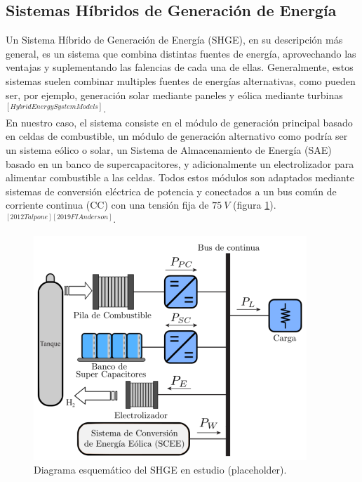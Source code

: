 \subsection{Sistemas Híbridos de Generación de Energía}

Un Sistema Híbrido de Generación de Energía (SHGE), en su descripción más general, es un sistema que combina distintas fuentes de energía, aprovechando las ventajas y suplementando las falencias de cada una de ellas. Generalmente, estos sistemas suelen combinar multiples fuentes de energías alternativas, como pueden ser, por ejemplo, generación solar mediante paneles y eólica mediante turbinas$^{[HybridEnergySystemModels]}$.\\

En nuestro caso, el sistema consiste en el módulo de generación principal basado en celdas de combustible, un módulo de generación alternativo como podría ser un sistema eólico o solar, un Sistema de Almacenamiento de Energía (SAE) basado en un banco de supercapacitores, y adicionalmente  un electrolizador para alimentar combustible a las celdas. Todos estos módulos son adaptados mediante sistemas de conversión eléctrica de potencia y conectados a un bus común de corriente continua (CC) con una tensión fija de $75\ V$ (figura \ref{SHGE}).$^{[2012Talpone][2019FIAnderson]}$.\\

\begin{figure}[h]
    \centering
    \includegraphics[scale=0.75]{Imagenes/SHGE.png}
    \caption{Diagrama esquemático del SHGE en estudio (placeholder).}
    \label{SHGE}
\end{figure}

